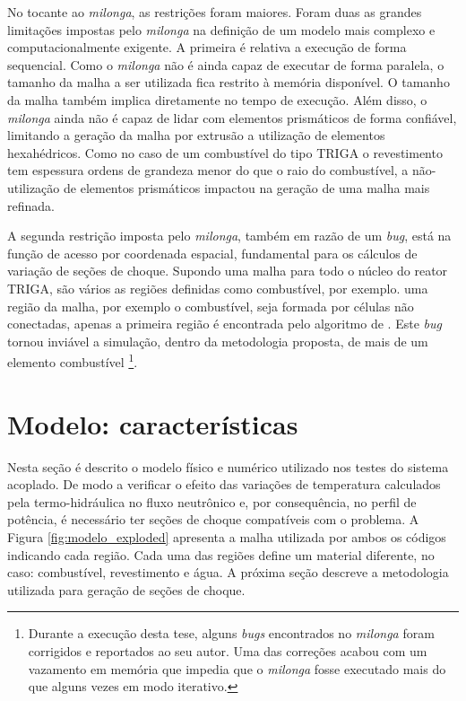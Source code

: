 No tocante ao \textit{milonga}, as restrições foram maiores. Foram duas as grandes limitações impostas
pelo \textit{milonga} na definição de um modelo mais complexo e computacionalmente exigente. A primeira
é relativa a execução de forma sequencial. Como o \textit{milonga} não é ainda capaz de executar de
forma paralela, o tamanho da malha a ser utilizada fica restrito à memória disponível.
O tamanho da malha também implica diretamente no tempo de execução.
Além disso, o \textit{milonga} ainda não é capaz de lidar com elementos prismáticos de forma confiável, limitando a
geração da malha por extrusão a utilização de elementos hexahédricos.
Como no caso de um combustível do tipo TRIGA o revestimento tem espessura ordens de grandeza
menor do que o raio do combustível, a não-utilização de elementos prismáticos impactou na geração
de uma malha mais refinada.

A segunda restrição imposta pelo \textit{milonga}, também em razão de um \textit{bug}, está na função
de acesso por coordenada espacial, fundamental para os cálculos de variação de seções de choque.
Supondo uma malha para todo o núcleo do reator TRIGA, são vários as regiões definidas como combustível, por exemplo.
uma região da malha, por exemplo o combustível,
seja formada por células não conectadas, apenas a primeira região é encontrada pelo algoritmo de . Este \textit{bug} tornou
inviável a simulação, dentro da metodologia proposta, de mais de um elemento combustível
\footnote{Durante a execução desta tese, alguns \textit{bugs} encontrados no \textit{milonga} foram corrigidos e
  reportados ao seu autor. Uma das correções acabou com um vazamento em memória que impedia que o \textit{milonga}
  fosse executado mais do que alguns vezes em modo iterativo.}.


\section{Modelo: características}
%
%

Nesta seção é descrito o modelo físico e numérico utilizado nos testes do sistema acoplado.
De modo a verificar o efeito das variações de temperatura calculados pela termo-hidráulica
no fluxo neutrônico e, por consequência, no perfil de potência, é necessário ter seções
de choque compatíveis com o problema. A Figura \ref{fig:modelo_exploded} apresenta a malha
utilizada por ambos os códigos indicando cada região. Cada uma das regiões define um
material diferente, no caso: combustível, revestimento e água. A próxima seção descreve
a metodologia utilizada para geração de seções de choque. 


